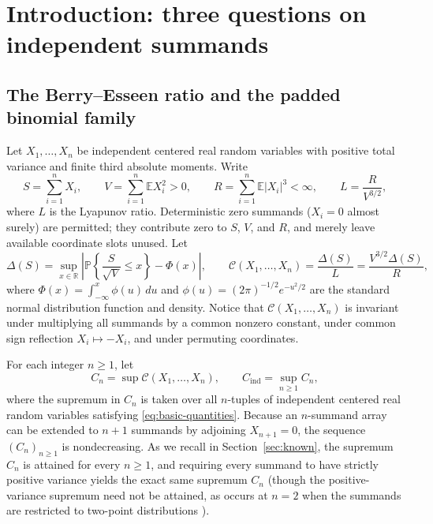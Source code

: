 \documentclass[11pt]{article}
\numberwithin{equation}{section}
\theoremstyle{definition}
\theoremstyle{remark}
\newcommand{\E}{\mathbb E}
\newcommand{\Pp}{\mathbb P}
\newcommand{\R}{\mathbb R}
\newcommand{\Cind}{C_{\mathrm{ind}}}
\begin{document}
\tableofcontents

\section{Introduction: three questions on independent summands}\label{sec:intro}

\subsection{The Berry--Esseen ratio and the padded binomial family}

Let $X_1,\ldots,X_n$ be independent centered real random variables with
positive total variance and finite third absolute moments. Write
\begin{equation}\label{eq:basic-quantities}
 S=\sum_{i=1}^n X_i,\qquad
 V=\sum_{i=1}^n\E X_i^2>0,\qquad
 R=\sum_{i=1}^n\E|X_i|^3<\infty,\qquad
 L=\frac{R}{V^{3/2}},
\end{equation}
where $L$ is the Lyapunov ratio. Deterministic zero summands ($X_i=0$ almost
surely) are permitted; they contribute zero to $S$, $V$, and $R$, and merely
leave available coordinate slots unused. Let
\begin{equation}\label{eq:kolmogorov-ratio}
 \Delta(S)=\sup_{x\in\R}\left|\Pp\left\{\frac{S}{\sqrt V}\le x\right\}-\Phi(x)\right|,\qquad
 \mathcal C(X_1,\ldots,X_n)=\frac{\Delta(S)}{L}=\frac{V^{3/2}\Delta(S)}{R},
\end{equation}
where $\Phi(x)=\int_{-\infty}^x\phi(u)\,du$ and
$\phi(u)=(2\pi)^{-1/2}e^{-u^2/2}$ are the standard normal distribution
function and density. Notice that $\mathcal C(X_1,\ldots,X_n)$ is invariant
under multiplying all summands by a common nonzero constant, under common
sign reflection $X_i\mapsto -X_i$, and under permuting coordinates.

For each integer $n\ge1$, let
\begin{equation}\label{eq:cn-cind}
 C_n=\sup\mathcal C(X_1,\ldots,X_n),\qquad
 \Cind=\sup_{n\ge1}C_n,
\end{equation}
where the supremum in $C_n$ is taken over all $n$-tuples of independent
centered real random variables satisfying \eqref{eq:basic-quantities}.
Because an $n$-summand array can be extended to $n+1$ summands by adjoining
$X_{n+1}=0$, the sequence $(C_n)_{n\ge1}$ is nondecreasing. As we recall in
Section~\ref{sec:known}, the supremum $C_n$ is attained for every $n\ge1$,
and requiring every summand to have strictly positive variance yields the
exact same supremum $C_n$ (though the positive-variance supremum need not be
attained, as occurs at $n=2$ when the summands are restricted to two-point
distributions \citep[Theorem~1.2]{BellBernoulli2026}).
\end{document}
